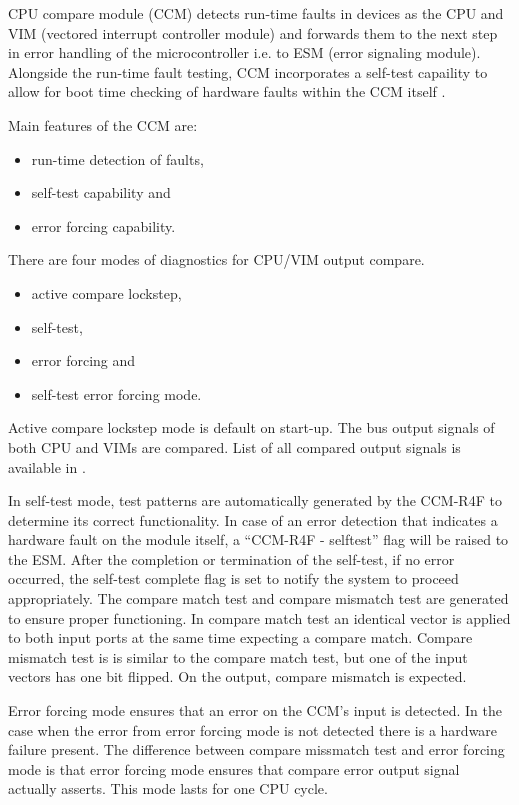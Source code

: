 CPU compare module (CCM) detects run-time faults in devices as the CPU and VIM (vectored interrupt controller module) and forwards them to the next step in error handling of the microcontroller i.e. to ESM (error signaling module). Alongside the run-time fault testing, CCM incorporates a self-test capaility to allow for boot time checking of hardware faults within the CCM itself \citep{TMS570LS31x21x_manual}.

Main features of the CCM are:
\begin{itemize}

    \item{run-time detection of faults,}
    \item{self-test capability and}
    \item{error forcing capability.}

\end{itemize}

There are four modes of diagnostics for CPU/VIM output compare.
\begin{itemize}

    \item active compare lockstep,
    \item self-test,
    \item error forcing and
    \item self-test error forcing mode.

\end{itemize}

Active compare lockstep mode is default on start-up. The bus output signals of both CPU and VIMs are compared. List of all compared output signals is available in \citep[p. 500]{TMS570LS31x21x_manual}.

In self-test mode, test patterns are automatically generated by the CCM-R4F to
determine its correct functionality. In case of an error detection that indicates a
hardware fault on the module itself, a “CCM-R4F - selftest” flag will be raised to
the ESM. After the completion or termination of the self-test, if no error occurred,
the self-test complete flag is set to notify the system to proceed appropriately. The compare match test and compare mismatch test are generated to ensure proper functioning. In compare match test an identical vector is applied to both input ports at the same time expecting a compare match. Compare mismatch test is is similar to the compare match test, but one of the input vectors has one bit flipped. On the output, compare mismatch is expected.

Error forcing mode ensures that an error on the CCM's input is detected. In the case when the error from  error forcing mode is not detected there is a hardware failure present. The difference between compare missmatch test and error forcing mode is that error forcing mode ensures that compare error output signal actually asserts. This mode lasts for one CPU cycle.